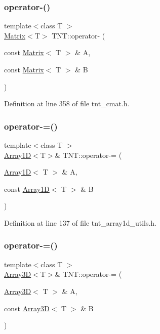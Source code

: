 \subsubsection{\texorpdfstring{operator-\/()}{operator-()}\hspace{0.1cm}{\footnotesize\ttfamily [7/7]}}
{\footnotesize\ttfamily template$<$class T $>$ \\
\hyperlink{classTNT_1_1Matrix}{Matrix}$<$T$>$ T\+N\+T\+::operator-\/ (\begin{DoxyParamCaption}\item[{const \hyperlink{classTNT_1_1Matrix}{Matrix}$<$ T $>$ \&}]{A,  }\item[{const \hyperlink{classTNT_1_1Matrix}{Matrix}$<$ T $>$ \&}]{B }\end{DoxyParamCaption})}



Definition at line 358 of file tnt\+\_\+cmat.\+h.

\mbox{\label{namespaceTNT_a299b0b9df874413857065f22f8ca5a91}} 
\subsubsection{\texorpdfstring{operator-\/=()}{operator-=()}\hspace{0.1cm}{\footnotesize\ttfamily [1/5]}}
{\footnotesize\ttfamily template$<$class T $>$ \\
\hyperlink{classTNT_1_1Array1D}{Array1D}$<$T$>$\& T\+N\+T\+::operator-\/= (\begin{DoxyParamCaption}\item[{\hyperlink{classTNT_1_1Array1D}{Array1D}$<$ T $>$ \&}]{A,  }\item[{const \hyperlink{classTNT_1_1Array1D}{Array1D}$<$ T $>$ \&}]{B }\end{DoxyParamCaption})}



Definition at line 137 of file tnt\+\_\+array1d\+\_\+utils.\+h.

\mbox{\label{namespaceTNT_a059e5ad1d2ce6b2c4d96f9cf87c68a04}} 
\subsubsection{\texorpdfstring{operator-\/=()}{operator-=()}\hspace{0.1cm}{\footnotesize\ttfamily [2/5]}}
{\footnotesize\ttfamily template$<$class T $>$ \\
\hyperlink{classTNT_1_1Array3D}{Array3D}$<$T$>$\& T\+N\+T\+::operator-\/= (\begin{DoxyParamCaption}\item[{\hyperlink{classTNT_1_1Array3D}{Array3D}$<$ T $>$ \&}]{A,  }\item[{const \hyperlink{classTNT_1_1Array3D}{Array3D}$<$ T $>$ \&}]{B }\end{DoxyParamCaption})}



